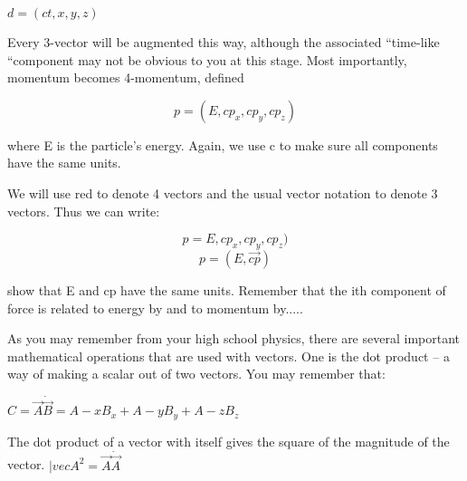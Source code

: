	 \center  $d=(ct,x,y,z)$

Every 3-vector will be augmented this way, although the associated “time-like “component may not be obvious to you at this stage.  Most importantly, momentum becomes 4-momentum, defined

	  \begin{equation}  p=(E,cp_x, cp_y, cp_z)  \end{equation}

where E is the particle’s energy. Again, we use c to make sure all components have the same units.
	 
We will use red to denote 4 vectors and the usual vector notation to denote 3 vectors.  Thus we can write:

	   \begin{equation} p=E,cp_x, cp_y, cp_z)  \end{equation}  	
	   \begin{equation} p=(E,\vec{cp})  \end{equation} 




	
\vspace{.2cm} 
\begin{minipage}{0.7\textwidth} 
\begin{framed}
\begin{exercise}
{show that E and cp have the same units. Remember that the ith component of force is related to energy by  and to momentum by.....}
\end{exercise}
\end{framed} 
\end{minipage}
\vspace{.2cm}





As you may remember from your high school physics, there are several important mathematical operations that are used with vectors.  One is the dot product – a way of making a scalar out of two vectors.  You may remember that:

                                        \center $C=\vec A \dot \vec B = A-xB_x +A-yB_y +A-zB_z $

The dot product of a vector with itself gives the square of the magnitude of the vector.
      \center $| vec{A^2} =\vec A \dot \vec A  $
	  
